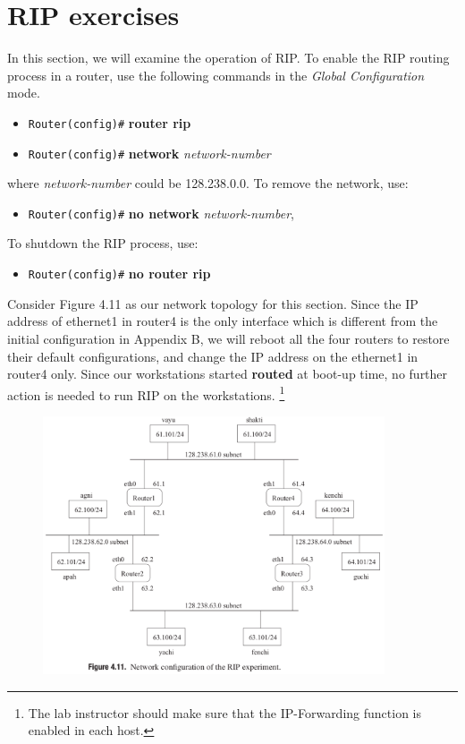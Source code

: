 \documentclass[10pt,a4paper]{article}
\numberwithin{equation}{section}
\numberwithin{figure}{section}
\numberwithin{table}{section}
\begin{document}
\section*{RIP exercises}
    In this section, we will examine the operation of RIP. To enable the RIP routing process in a router, use the following commands in the \textit{Global Configuration} mode.
    \begin{itemize}
        \item \texttt{Router(config)\#} \textbf{router rip}
        \item \texttt{Router(config)\#} \textbf{network} \textit{network-number}
    \end{itemize}
    where \textit{network-number} could be 128.238.0.0. To remove the network, use:
    \begin{itemize}
        \item \texttt{Router(config)\#} \textbf{no network} \textit{network-number},
    \end{itemize}
    To shutdown the RIP process, use:
    \begin{itemize}
        \item \texttt{Router(config)\#} \textbf{no router rip}
    \end{itemize}
    Consider Figure 4.11 as our network topology for this section.
    Since the IP address of ethernet1 in router4 is the only interface which is different from the initial configuration in Appendix B, we will reboot all the four routers to restore their default configurations, and change the IP address on the ethernet1 in router4 only. Since our workstations started \textbf{routed} at boot-up time, no further action is needed to run RIP on the workstations. \footnote{The lab instructor should make sure that the IP-Forwarding function is enabled in each host.}
    \begin{figure}[H]
        \centering
        \includegraphics[width=0.9\textwidth]{img/figure4-11.png}
    \end{figure}
\end{document}
